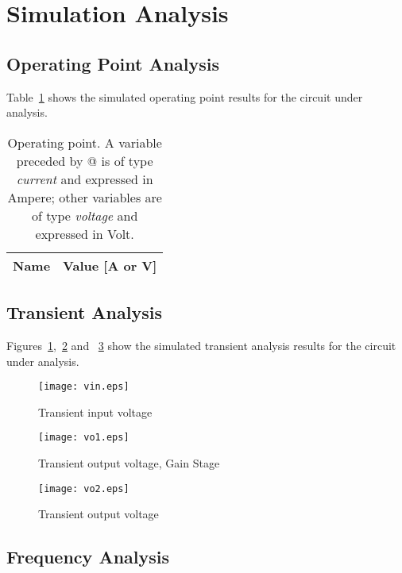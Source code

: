 \section{Simulation Analysis}
\label{sec:simulation}

\subsection{Operating Point Analysis}


Table~\ref{tab:op} shows the simulated operating point results for the circuit
under analysis.

\begin{table}[h]
  \centering
  \begin{tabular}{|l|r|}
    \hline
    {\bf Name} & {\bf Value [A or V]} \\ \hline
    
  \end{tabular}
  \caption{Operating point. A variable preceded by @ is of type {\em current}
    and expressed in Ampere; other variables are of type {\it voltage} and expressed in
    Volt.}
  \label{tab:op}
\end{table}


\clearpage
\subsection{Transient Analysis}

Figures~\ref{fig:transvin},~\ref{fig:transvo1} and ~\ref{fig:transvo2} show the simulated transient analysis results for the circuit under analysis.

\begin{figure}[h] \centering
\texttt{[image: vin.eps]}
\caption{Transient input voltage}
\label{fig:transvin}
\end{figure}

\begin{figure}[h] \centering
\texttt{[image: vo1.eps]}
\caption{Transient output voltage, Gain Stage}
\label{fig:transvo1}
\end{figure}


\vspace{30mm}
\begin{figure}[h] \centering
\texttt{[image: vo2.eps]}
\caption{Transient output voltage}
\label{fig:transvo2}
\end{figure}


\subsection{Frequency Analysis}

